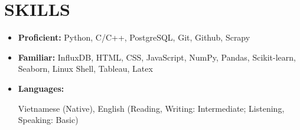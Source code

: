 \documentclass[letterpaper,11pt]{article}
\begin{document}
\section{SKILLS}
\vspace{3mm}
\begin{itemize}[leftmargin=*]
    \item \textbf{\small Proficient:} Python, C/C++, PostgreSQL, Git, Github, Scrapy
    \item \textbf{\small Familiar:} InfluxDB, HTML, CSS, JavaScript, NumPy, Pandas, Scikit-learn, Seaborn, Linux Shell, Tableau, Latex
    \item \textbf{\small Languages: }\raggedright Vietnamese (Native), English (Reading, Writing: Intermediate; Listening, Speaking: Basic)
\end{itemize}
    

\end{document}
